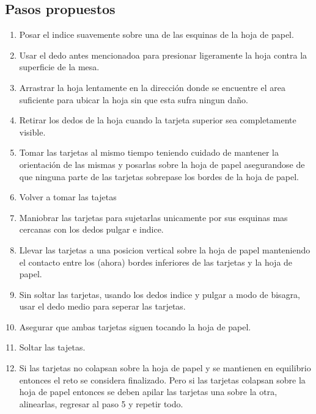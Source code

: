 \documentclass{article}
\begin{document}
\subsection{Pasos propuestos}
%
\begin{enumerate}
    \item Posar el indice suavemente sobre una de las esquinas de la hoja de papel.
    \item Usar el dedo antes mencionadoa para presionar ligeramente la hoja contra la superficie de la mesa.
    \item Arrastrar la hoja lentamente en la dirección donde se encuentre el area suficiente para ubicar la hoja sin que esta sufra ningun daño.
    \item Retirar los dedos de la hoja cuando la tarjeta superior sea completamente visible.
    \item Tomar las tarjetas al mismo tiempo teniendo cuidado de mantener la orientación de las mismas y posarlas sobre la hoja de papel asegurandose de que ninguna parte de las tarjetas sobrepase los bordes de la hoja de papel.
    \item Volver a tomar las tajetas
    \item Maniobrar las tarjetas para sujetarlas unicamente por sus esquinas mas cercanas con los dedos pulgar e indice.
    \item Llevar las tarjetas a una posicion vertical sobre la hoja de papel manteniendo el contacto entre los (ahora) bordes inferiores de las tarjetas y la hoja de papel.
    \item Sin soltar las tarjetas, usando los dedos indice y pulgar a modo de bisagra, usar el dedo medio para seperar las tarjetas.
    \item Asegurar que ambas tarjetas siguen tocando la hoja de papel.
    \item Soltar las tajetas.
    \item Si las tarjetas no colapsan sobre la hoja de papel y se mantienen en equilibrio entonces el reto se considera finalizado. Pero si las tarjetas colapsan sobre la hoja de papel entonces se deben apilar las tarjetas una sobre la otra, alinearlas, regresar al paso 5 y repetir todo.
\end{enumerate}
\end{document}
